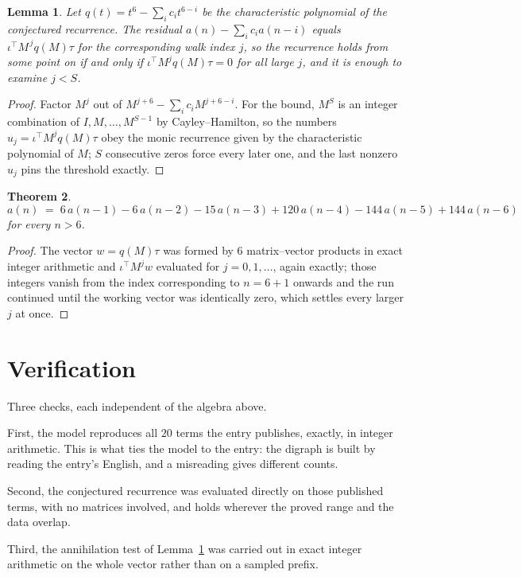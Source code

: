 \documentclass[11pt,a4paper]{article}
\theoremstyle{plain}
\newtheorem{theorem}{Theorem}
\newtheorem{lemma}[theorem]{Lemma}
\theoremstyle{definition}
\begin{document}
\begin{lemma}\label{lem:crit}
Let $q(t)=t^{6}-\sum_i c_it^{6-i}$ be the characteristic polynomial of the
conjectured recurrence. The residual $a(n)-\sum_ic_ia(n-i)$ equals
$\iota^{\!\top}M^{\,j}q(M)\tau$ for the corresponding walk index $j$, so the recurrence
holds from some point on if and only if $\iota^{\!\top}M^{j}q(M)\tau=0$ for all large $j$,
and it is enough to examine $j<S$.
\end{lemma}

\begin{proof}
Factor $M^{j}$ out of $M^{j+6}-\sum_ic_iM^{j+6-i}$. For the bound, $M^{S}$
is an integer combination of $I,M,\dots,M^{S-1}$ by Cayley--Hamilton, so the numbers
$u_j=\iota^{\!\top}M^{j}q(M)\tau$ obey the monic recurrence given by the characteristic
polynomial of $M$; $S$ consecutive zeros force every later one, and the last nonzero $u_j$
pins the threshold exactly.
\end{proof}

\begin{theorem}
\[
a(n)\;=\;6\,a(n-1) - 6\,a(n-2) - 15\,a(n-3) + 120\,a(n-4) - 144\,a(n-5) + 144\,a(n-6)
\]
for every $n>6$.
\end{theorem}

\begin{proof}
The vector $w=q(M)\tau$ was formed by $6$ matrix--vector products in exact integer
arithmetic and $\iota^{\!\top}M^{j}w$ evaluated for $j=0,1,\dots$, again exactly; those
integers vanish from the index corresponding to $n=6+1$ onwards and the run continued
until the working vector was identically zero, which settles every larger $j$ at once.
\end{proof}

\section{Verification}

Three checks, each independent of the algebra above.

First, the model reproduces all $20$ terms the entry publishes, exactly, in integer
arithmetic. This is what ties the model to the entry: the digraph is built by reading the
entry's English, and a misreading gives different counts.

Second, the conjectured recurrence was evaluated directly on those published terms, with no
matrices involved, and holds wherever the proved range and the data overlap.

Third, the annihilation test of Lemma~\ref{lem:crit} was carried out in exact integer
arithmetic on the whole vector rather than on a sampled prefix.
\end{document}

